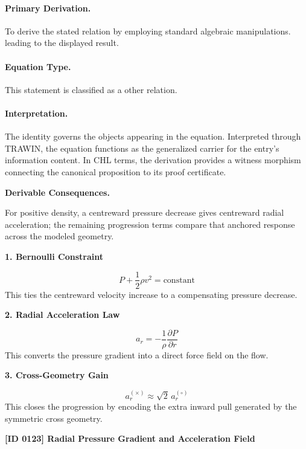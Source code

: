 \paragraph{Primary Derivation.}
To derive the stated relation by employing standard algebraic manipulations. leading to the displayed result.
\paragraph{Equation Type.}
This statement is classified as a other relation.

\paragraph{Interpretation.}
The identity governs the objects appearing in the equation. Interpreted through TRAWIN, the equation functions as the generalized carrier for the entry’s information content. In CHL terms, the derivation provides a witness morphism connecting the canonical proposition to its proof certificate.

\par\vspace{0.35em}
\noindent\textbf{Derivable Consequences.}\quad
\begingroup
\footnotesize
\raggedright
For positive density, a centreward pressure decrease gives centreward radial acceleration; the remaining progression terms compare that anchored response across the modeled geometry.
\par\endgroup

\noindent\textbf{1. Bernoulli Constraint}\par
\[
P + \frac{1}{2}\rho v^2 = \mathrm{constant}
\]
\noindent This ties the centreward velocity increase to a compensating pressure decrease.\par
\noindent\textbf{2. Radial Acceleration Law}\par
\[
a_r = -\frac{1}{\rho}\frac{\partial P}{\partial r}
\]
\noindent This converts the pressure gradient into a direct force field on the flow.\par
\noindent\textbf{3. Cross-Geometry Gain}\par
\[
a_r^{(\times)} \approx \sqrt{2}\, a_r^{(\circ)}
\]
\noindent This closes the progression by encoding the extra inward pull generated by the symmetric cross geometry.\par

\clearpage
\noindent\textbf{[ID 0123] Radial Pressure Gradient and Acceleration Field}\par
\vspace{0.35em}
\begingroup\small

